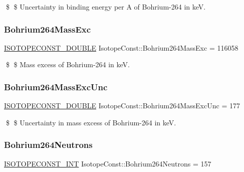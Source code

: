 \$ \$ Uncertainty in binding energy per A of Bohrium-\/264 in keV. \mbox{\label{group___isotope_const-_bohrium-_bh264_ga9a4954c321d7eeffa6f015b90d7bfa66}} 
\subsubsection{\texorpdfstring{Bohrium264\+Mass\+Exc}{Bohrium264MassExc}}
{\footnotesize\ttfamily \mbox{\hyperlink{group___isotope_const-_macros_ga8f45a7272ce02c0b4c65c44636ed719a}{I\+S\+O\+T\+O\+P\+E\+C\+O\+N\+S\+T\+\_\+\+D\+O\+U\+B\+LE}} Isotope\+Const\+::\+Bohrium264\+Mass\+Exc = 116058}

\$ \$ Mass excess of Bohrium-\/264 in keV. \mbox{\label{group___isotope_const-_bohrium-_bh264_ga4269a442b54adf7a16961921be655c3f}} 
\subsubsection{\texorpdfstring{Bohrium264\+Mass\+Exc\+Unc}{Bohrium264MassExcUnc}}
{\footnotesize\ttfamily \mbox{\hyperlink{group___isotope_const-_macros_ga8f45a7272ce02c0b4c65c44636ed719a}{I\+S\+O\+T\+O\+P\+E\+C\+O\+N\+S\+T\+\_\+\+D\+O\+U\+B\+LE}} Isotope\+Const\+::\+Bohrium264\+Mass\+Exc\+Unc = 177}

\$ \$ Uncertainty in mass excess of Bohrium-\/264 in keV. \mbox{\label{group___isotope_const-_bohrium-_bh264_ga78f24bcb7a7cfa561f3cc8b79a583b63}} 
\subsubsection{\texorpdfstring{Bohrium264\+Neutrons}{Bohrium264Neutrons}}
{\footnotesize\ttfamily \mbox{\hyperlink{group___isotope_const-_macros_ga5f18360b3e99483a35c32d789e62621c}{I\+S\+O\+T\+O\+P\+E\+C\+O\+N\+S\+T\+\_\+\+I\+NT}} Isotope\+Const\+::\+Bohrium264\+Neutrons = 157}

